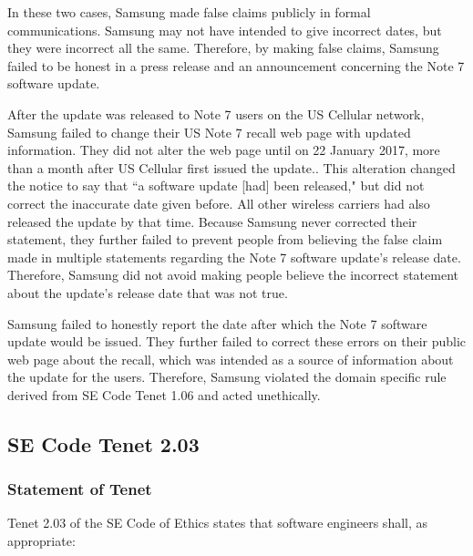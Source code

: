 \documentclass[12pt]{article}
\newcounter{subsubsubsection}[subsubsection]
\begin{document}
      In these two cases, Samsung made false claims publicly in formal communications\cite{waybackmachineRecallNoticeDec9}\cite{samsungNewsroomUpdateAnnoucement}\cite{pocketnowNoLongerWorkMessageUSCellular}. Samsung may not have intended to give incorrect dates, but they were incorrect all the same. Therefore, by making false claims, Samsung failed to be honest in a press release and an announcement concerning the Note 7 software update.
      
      After the update was released to Note 7 users on the US Cellular network, Samsung failed to change their US Note 7 recall web page with updated information\cite{waybackmachineSamsungChangedRecallNotiec}. They did not alter the web page until on 22 January 2017, more than a month after US Cellular first issued the update.\cite{waybackmachineSamsungChangedRecallNotiec}. This alteration changed the notice to say that ``a software update [had] been released," but did not correct the inaccurate date given before\cite{waybackmachineSamsungChangedRecallNotiec}. All other wireless carriers had also released the update by that time. Because Samsung never corrected their statement, they further failed to prevent people from believing the false claim made in multiple statements regarding the Note 7 software update's release date. Therefore, Samsung did not avoid making people believe the incorrect statement about the update's release date that was not true.
      
      Samsung failed to honestly report the date after which the Note 7 software update would be issued. They further failed to correct these errors on their public web page about the recall, which was intended as a source of information about the update for the users\cite{waybackmachineSamsungChangedRecallNotiec}. Therefore, Samsung violated the domain specific rule derived from SE Code Tenet 1.06 and acted unethically.

\subsection{SE Code Tenet 2.03}

\subsubsection{Statement of Tenet}
Tenet 2.03 of the SE Code of Ethics states that software engineers shall, as appropriate:
\end{document}
